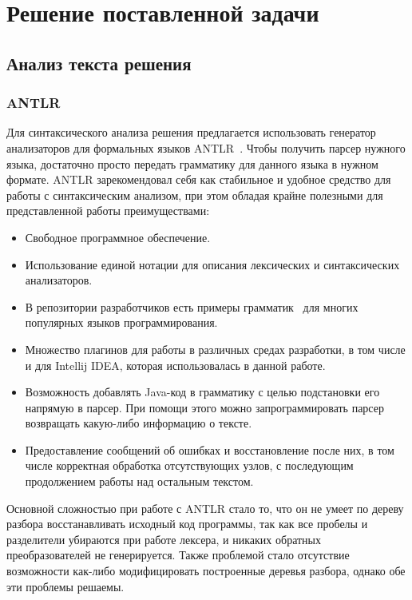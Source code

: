 \chapter{Решение поставленной задачи}

\section{Анализ текста решения}

\subsection{ANTLR}
Для синтаксического анализа решения предлагается использовать генератор анализаторов для формальных языков ANTLR~\cite{antlr-site, antlr-doc}.
Чтобы получить парсер нужного языка, достаточно просто передать грамматику для данного языка в нужном формате.
ANTLR зарекомендовал себя как стабильное и удобное средство для работы с синтаксическим анализом, при этом
обладая крайне полезными для представленной работы преимуществами:
\begin{itemize}
    \item Свободное программное обеспечение.
    \item Использование единой нотации для описания лексических и синтаксических анализаторов.
    \item В репозитории разработчиков есть примеры грамматик~\cite{antlr-grammar} для многих популярных языков программирования.
    \item Множество плагинов для работы в различных средах разработки, в том числе и для Intellij IDEA, которая
        использовалась в данной работе.
    \item Возможность добавлять Java-код в грамматику с целью подстановки его напрямую в парсер. При помощи этого 
        можно запрограммировать парсер возвращать какую-либо информацию о тексте.
    \item Предоставление сообщений об ошибках и восстановление после них, в том числе корректная обработка отсутствующих узлов, 
        с последующим продолжением работы над остальным текстом. 
\end{itemize} 

Основной сложностью при работе с ANTLR стало то, что он не умеет по дереву разбора восстанавливать исходный код программы, так
как все пробелы и разделители убираются при работе лексера, и никаких обратных преобразователей не генерируется. Также проблемой
стало отсутствие возможности как-либо модифицировать построенные деревья разбора, однако обе эти проблемы решаемы.

